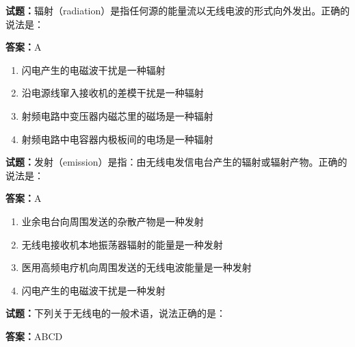 \documentclass{ctexbook}
\begin{document}



\vspace{1em}

\textbf{试题：}辐射（radiation）是指任何源的能量流以无线电波的形式向外发出。正确的说法是： 

\textbf{答案：}A 

\begin{enumerate}[leftmargin=3em]
  \item 闪电产生的电磁波干扰是一种辐射 

  \item 沿电源线窜入接收机的差模干扰是一种辐射 

  \item 射频电路中变压器内磁芯里的磁场是一种辐射 

  \item 射频电路中电容器内极板间的电场是一种辐射 

\end{enumerate}





\vspace{1em}

\textbf{试题：}发射（emission）是指：由无线电发信电台产生的辐射或辐射产物。正确的说法是： 

\textbf{答案：}A 

\begin{enumerate}[leftmargin=3em]
  \item 业余电台向周围发送的杂散产物是一种发射 

  \item 无线电接收机本地振荡器辐射的能量是一种发射 

  \item 医用高频电疗机向周围发送的无线电波能量是一种发射 

  \item 闪电产生的电磁波干扰是一种发射 

\end{enumerate}





\vspace{1em}

\textbf{试题：}下列关于无线电的一般术语，说法正确的是： 

\textbf{答案：}ABCD 
\end{document}
